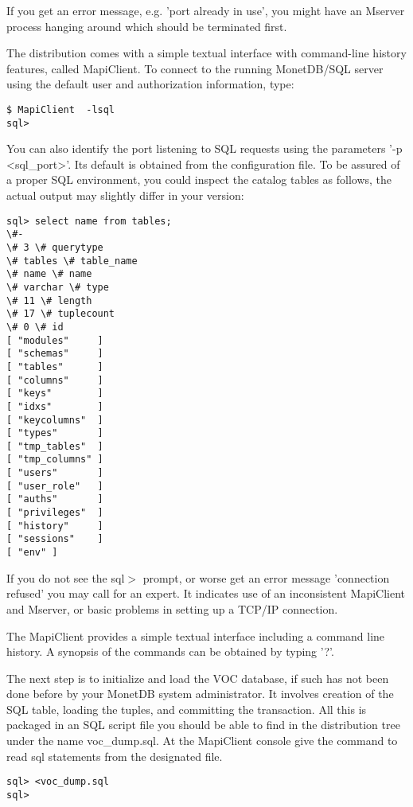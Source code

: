 \documentclass[10pt,twocolumn,fleqn]{article}
\begin{document}
If you get an error message, e.g. 'port already in use', you might have 
an Mserver process hanging around which should be terminated first.

The distribution comes with a simple textual interface with
command-line history features, called MapiClient.
To connect to the running MonetDB/SQL server using the
default user and authorization information, type:

\begin{verbatim}
$ MapiClient  -lsql 
sql>
\end{verbatim}
You can also identify the port listening to SQL requests using
the parameters '-p <sql\_port>'. Its default is obtained from
the configuration file.
To be assured of a proper SQL environment, you could inspect the catalog
tables as follows, the actual output may slightly differ in your version:
\begin{verbatim}
sql> select name from tables;
\#-
\# 3 \# querytype
\# tables \# table_name
\# name \# name
\# varchar \# type
\# 11 \# length
\# 17 \# tuplecount
\# 0 \# id
[ "modules"     ]
[ "schemas"     ]
[ "tables"      ]
[ "columns"     ]
[ "keys"        ]
[ "idxs"        ]
[ "keycolumns"  ]
[ "types"       ]
[ "tmp_tables"  ]
[ "tmp_columns" ]
[ "users"       ]
[ "user_role"   ]
[ "auths"       ]
[ "privileges"  ]
[ "history"     ]
[ "sessions"    ]
[ "env" ]
\end{verbatim}

If you do not see the sql$>$ prompt, or worse get an error
message 'connection refused' you may call for an expert.
It indicates use of an inconsistent MapiClient and Mserver,
or basic problems in setting up a TCP/IP connection.

The MapiClient provides a simple textual interface including
a command line history. A synopsis of the commands can be obtained
by typing '?'.

The next step is to initialize and load the VOC database, if such has
not been done before by your MonetDB system administrator. It involves
creation of the SQL table, loading the tuples, and committing the
transaction. All this is packaged in an SQL script file you should
be able to find in the distribution tree under the name voc\_dump.sql.
At the MapiClient console give the command to read sql statements
from the designated file.

\begin{verbatim}
sql> <voc_dump.sql
sql>
\end{verbatim}
\end{document}
